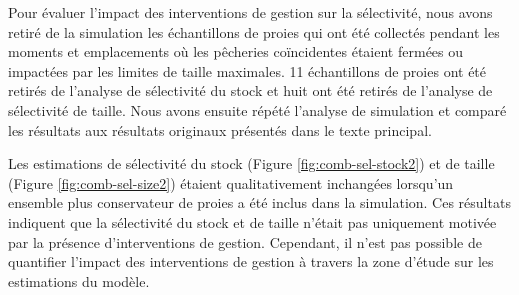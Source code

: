 
Pour évaluer l'impact des interventions de gestion sur la sélectivité, nous avons retiré de la simulation les échantillons de proies qui ont été collectés pendant les moments et emplacements où les pêcheries coïncidentes étaient fermées ou impactées par les limites de taille maximales. 11 échantillons de proies ont été retirés de l'analyse de sélectivité du stock et huit ont été retirés de l'analyse de sélectivité de taille. Nous avons ensuite répété l'analyse de simulation et comparé les résultats aux résultats originaux présentés dans le texte principal.

Les estimations de sélectivité du stock (Figure \ref{fig:comb-sel-stock2}) et de taille (Figure \ref{fig:comb-sel-size2}) étaient qualitativement inchangées lorsqu'un ensemble plus conservateur de proies a été inclus dans la simulation. Ces résultats indiquent que la sélectivité du stock et de taille n'était pas uniquement motivée par la présence d'interventions de gestion. Cependant, il n'est pas possible de quantifier l'impact des interventions de gestion à travers la zone d'étude sur les estimations du modèle.

